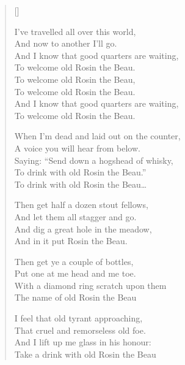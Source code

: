 \pagebreak
\settowidth{\versewidth}{And I know that good quarters are waiting,}
\begin{verse}[\versewidth]
\begin{patverse}
I've travelled all over this world,\\
And now to another I'll go.\\
And I know that good quarters are waiting,\\
To welcome old Rosin the Beau.\\
To welcome old Rosin the Beau,\\
To welcome old Rosin the Beau.\\
And I know that good quarters are waiting,\\
To welcome old Rosin the Beau.
\end{patverse}

\begin{patverse}
When I'm dead and laid out on the counter,\\
A voice you will hear from below.\\
Saying: ``Send down a hogshead of whisky,\\
To drink with old Rosin the Beau.''\\
To drink with old Rosin the Beau\dots{}
\end{patverse}

Then get half a dozen stout fellows,\\
And let them all stagger and go.\\
And dig a great hole in the meadow,\\
And in it put Rosin the Beau.

Then get ye a couple of bottles,\\
Put one at me head and me toe.\\
With a diamond ring scratch upon them\\
The name of old Rosin the Beau

I feel that old tyrant approaching,\\
That cruel and remorseless old foe.\\
And I lift up me glass in his honour:\\
Take a drink with old Rosin the Beau


\end{verse}
